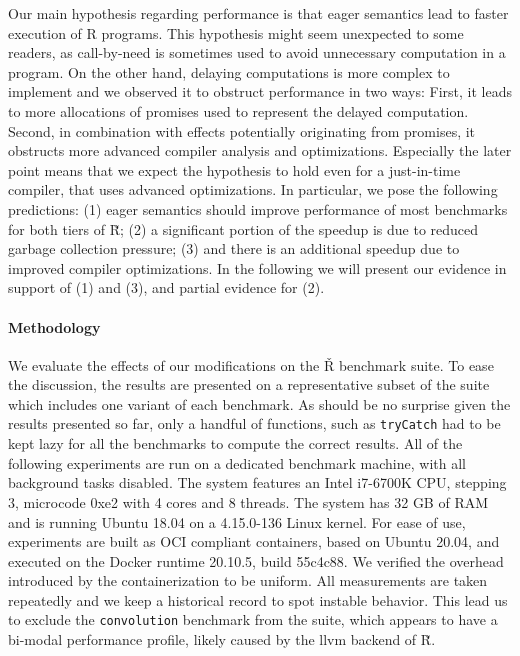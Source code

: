 \documentclass[review,nonacm,screen,acmsmall,anonymous=true]{acmart}
\renewcommand{\Rsh}{{\sf\u R}\xspace}
\begin{document}
Our main hypothesis regarding performance is that eager semantics lead to faster
execution of R programs. This hypothesis might seem unexpected to some readers,
as call-by-need is sometimes used to avoid unnecessary computation in a program.
On the other hand, delaying computations is more complex to implement and we
observed it to obstruct performance in two ways: First, it leads to more
allocations of promises used to represent the delayed computation. Second, in
combination with effects potentially originating from promises, it obstructs
more advanced compiler analysis and optimizations. Especially the later point
means that we expect the hypothesis to hold even for a just-in-time compiler,
that uses advanced optimizations.
In particular, we pose the following predictions:
(1) eager semantics should improve performance of most benchmarks for both tiers
of \Rsh; (2) a significant portion of the speedup is due to reduced garbage
collection pressure; (3) and there is an additional speedup due to improved compiler
optimizations. In the following we will present our evidence in support of (1)
and (3), and partial evidence for (2).

\paragraph{Methodology}

We evaluate the effects of our modifications on the Ř benchmark suite.
To ease the discussion, the results are presented on a representative subset of
the suite which includes one variant of
each benchmark. As should be no surprise given the results presented so far,
only a handful of functions, such as
\lstinline{tryCatch} had to be kept lazy for all the benchmarks to compute
the correct results.
All of the following experiments are run on a dedicated benchmark machine, with
all background tasks disabled. The system features an Intel i7-6700K CPU, stepping 3,
microcode 0xe2 with 4 cores and 8 threads. The system has 32 GB of RAM and is
running Ubuntu 18.04 on a 4.15.0-136 Linux kernel. For ease of use, experiments
are built as OCI compliant containers, based on Ubuntu 20.04, and executed on
the Docker runtime 20.10.5, build 55c4c88. We verified the overhead introduced by
the containerization to be uniform. All measurements are taken repeatedly and we
keep a historical record to spot instable behavior. This lead us to exclude the
\lstinline{convolution} benchmark from the suite, which appears to have a
bi-modal performance profile, likely caused by the llvm backend of \Rsh.
\end{document}
